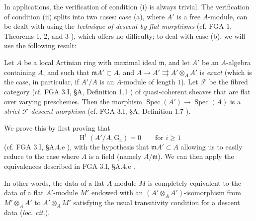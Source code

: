 In applications, the verification of condition (i) is always trivial.
The verification of condition (ii) splits into two cases: case (a), where $A'$ is a free $A$-module, can be dealt with using the \emph{technique of descent by flat morphisms} (cf. FGA 1, Theorems 1, 2, and 3 ), which offers no difficulty;
to deal with case (b), we will use the following result:


\begin{theorem}\label{fga3.ii-b-theorem-2}
Let $A$ be a local Artinian ring with maximal ideal $\mathfrak{m}$, and let $A'$ be an $A$-algebra containing $A$, and such that $\mathfrak{m}A'\subset A$, and $A\to A'\rightrightarrows A'\otimes_A A'$ is \emph{exact} (which is the case, in particular, if $A'/A$ is an $A$-module of length $1$).
Let $\mathcal{F}$ be the fibred category (cf. FGA 3.I, §A, Definition 1.1 ) of quasi-coherent sheaves that are flat over varying preschemes.
Then the morphism $\operatorname{Spec}(A')\to\operatorname{Spec}(A)$ is a \emph{strict $\mathcal{F}$-descent morphism} (cf. FGA 3.I, §A, Definition 1.7 ).
\end{theorem}

\begin{cproof}
    We prove this by first proving that
    \[
        \operatorname{H}^i(A'/A,\operatorname{G_a}) = 0
        \qquad\text{for }i\geqslant1
    \]
    (cf. FGA 3.I, §A.4.e ), with the hypothesis that $\mathfrak{m}A'\subset A$ allowing us to easily reduce to the case where $A$ is a field (namely $A/\mathfrak{m}$).
    We can then apply the equivalences described in FGA 3.I, §A.4.e .
\end{cproof}


In other words, the data of a flat $A$-module $M$ is completely equivalent to the data of a flat $A'$-module $M'$ endowed with an $(A'\otimes_A A')$-isomorphism from $M'\otimes_A A'$ to $A'\otimes_A M'$ satisfying the usual transitivity condition for a descent data (\emph{loc. cit.}).
